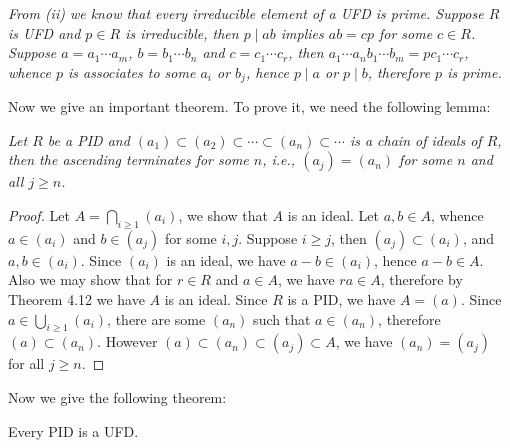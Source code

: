 \begin{note}\em
From (ii) we know that every irreducible element of a UFD is prime. Suppose $R$ is UFD and $p\in R$ is irreducible, then $p\mid ab$ implies $ab=cp$ for some $c\in R$. Suppose $a=a_1\cdots a_m$, $b=b_1\cdots b_n$ and $c=c_1\cdots c_r$, then $a_1\cdots a_nb_1\cdots b_m=pc_1\cdots c_r$, whence $p$ is associates to some $a_i$ or $b_j$, hence $p\mid a$ or $p\mid b$, therefore $p$ is prime.
\end{note}
Now we give an important theorem. To prove it, we need the following lemma:
\begin{lemma}\em
Let $R$ be a PID and $(a_1)\subset(a_2)\subset\cdots\subset(a_n)\subset\cdots$ is a chain of ideals of $R$, then the ascending terminates for some $n$, i.e., $(a_j)=(a_n)$ for some $n$ and all $j\ge n$.
\end{lemma}
\begin{proof}
Let $A=\bigcap_{i\ge 1}(a_i)$, we show that $A$ is an ideal. Let $a,b\in A$, whence $a\in (a_i)$ and $b\in (a_j)$ for some $i,j$. Suppose $i\ge j$, then $(a_j)\subset(a_i)$, and $a,b\in (a_i)$. Since $(a_i)$ is an ideal, we have $a-b\in (a_i)$, hence $a-b\in A$. Also we may show that for $r\in R$ and $a\in A$, we have $ra\in A$, therefore by Theorem 4.12 we have $A$ is an ideal. Since $R$ is a PID, we have $A=(a)$. Since $a\in\bigcup_{i\ge 1}(a_i)$, there are some $(a_n)$ such that $a\in (a_n)$, therefore $(a)\subset (a_n)$. However $(a)\subset (a_n)\subset (a_j)\subset A$, we have $(a_n)=(a_j)$ for all $j\ge n$.
\end{proof}
Now we give the following theorem:
\begin{theorem}
Every PID is a UFD.
\end{theorem}
